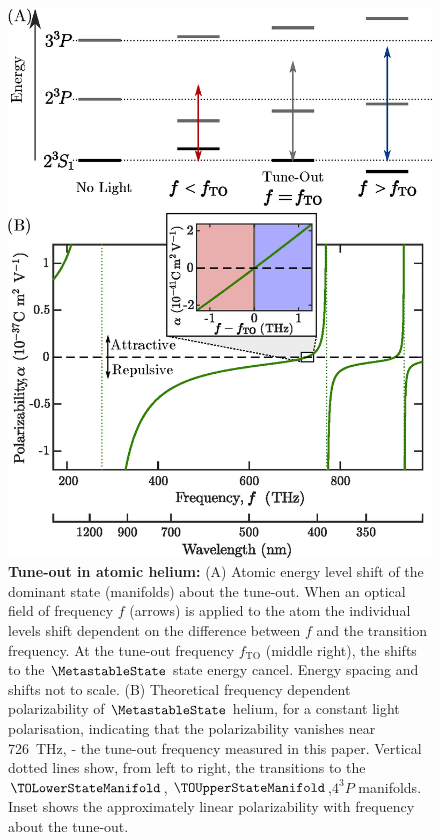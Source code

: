 	\begin{figure} 
		\centering
		\includegraphics[width=\textwidth]{fig/tuneout/composite_polz_fig}
		\caption{\textbf{Tune-out in atomic helium:}
		(A) Atomic energy level shift of the dominant state (manifolds) about the tune-out.  When an optical field of frequency $f$ (arrows) is applied to the atom the individual
		levels shift dependent on the difference between $f$ and the transition frequency. At the tune-out frequency $f_{\mathrm{TO}}$ (middle right), the shifts to the $\MetastableState$ state energy cancel.
		Energy spacing and shifts not to scale.
		(B) Theoretical frequency dependent polarizability of $\MetastableState$ helium, for a constant light polarisation, indicating that the polarizability vanishes near 726~THz, - the tune-out frequency measured in this paper. 
		Vertical dotted lines show, from left to right, the transitions to the  $\TOLowerStateManifold$, $\TOUpperStateManifold$,$4^{3\!}P$ manifolds. Inset shows the approximately linear polarizability with frequency about the tune-out.
		}
		\label{fig:schematic} 
	\end{figure}


